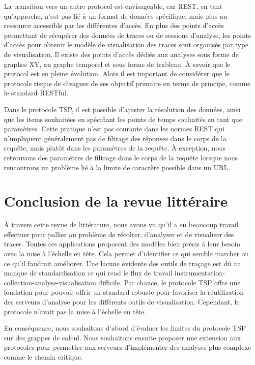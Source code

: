 La transition vers un autre protocol est envisageable, car REST, en tant qu'approche, n'est pas lié à un format de données spécifique, mais plus au ressource accessible par les différentes d'accès. En plus des points d'accès permettant de récupérer des données de traces ou de sessions d'analyse, les points d'accès pour obtenir le modèle de visualisation des traces sont organisés par type de visualisation. Il existe des points d'accès dédiés aux analyses sous forme de graphes XY, au graphe temporel et sous forme de trableau. À savoir que le protocol est en pleine évolution. Alors il est important de considérer que le protocole risque de divaguer de ses objectif primaire en terme de principe, comme le standard RESTful.

Dans le protocole TSP, il est possible d'ajuster la résolution des données, ainsi que les items souhaitées en spécifiant les points de temps souhaités en tant que paramètres. Cette pratique n'est pas courante dans les normes REST qui n'impliquent généralement pas de filtrage des réponses dans le corps de la requête, mais plutôt dans les paramètres de la requête. À exception, nous retrouvons des paramètres de filtrage dans le corps de la requête lorsque nous rencontrons un problème lié à la limite de caractère possible dans un URL.





\section{Conclusion de la revue littéraire}

À travers cette revue de littérature, nous avons vu qu'il a eu beaucoup travail effectuer pour pallier au problème de récolter, d'analyser et de visualiser des traces. Toutes ces applications proposent des modèles bien précis à leur besoin avec la mise à l'échelle en tête. Cela permet d'identifier ce qui semble marcher ou ce qu'il faudrait améliorer. Une lacune évidente des outils de traçage est dû au manque de standardisation ce qui rend le flux de travail instrumentation-collection-analyse-visualisation difficile. Par chance, le protocole TSP offre une fondation pour pouvoir offrir un standard robuste pour favoriser la réutilisation des serveurs d'analyse pour les différents outils de visualisation. Cependant, le protocole n'avait pas la mise à l'échelle en tête.

En conséquence, nous souhaitons d'abord d'évaluer les limites du protocole TSP sur des grappes de calcul. Nous souhaitons ensuite proposer une extension aux protocoles pour permettre aux serveurs d'implémenter des analyses plus complexe comme le chemin critique.


